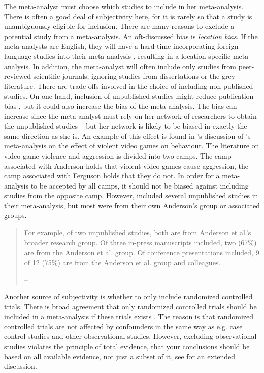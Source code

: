 The meta-analyst must choose which studies to include in her meta-analysis. There is often a good deal of subjectivity here, for it is rarely so that a study is unambiguously eligible for inclusion. There are many reasons to exclude a potential study from a meta-analysis. An oft-discussed bias is \emph{location bias}. If the meta-analysts are English, they will have a hard time incorporating foreign language studies into their meta-analysis \parencite{Egger1998-kj}, resulting in a location-specific meta-analysis. In addition, the meta-analyst will often include only studies from peer-reviewed scientific journals, ignoring studies from dissertations or the grey literature. There are trade-offs involved in the choice of including non-published studies. On one hand, inclusion of unpublished studies might reduce publication bias \parencite{Egger1997-ue}, but it could also increase the bias of the meta-analysis. The bias can increase since the meta-analyst must rely on her network of researchers to obtain the unpublished studies -- but her network is likely to be biased in exactly the same direction as she is. An example of this effect is found in \textcite{Ferguson2010-to}'s discussion of \textcite{Anderson2010-ki}'s meta-analysis on the effect of violent video games on behaviour. The literature on video game violence and aggression is divided into two camps. The camp associated with Anderson holds that violent video games cause aggression, the camp associated with Ferguson holds that they do not. In order for a meta-analysis to be accepted by all camps, it should not be biased against including studies from the opposite camp. However, \textcite{Anderson2010-ki} included several unpublished studies in their meta-analysis, but most were from their own Anderson's group or associated groups.
\begin{quote}
For example, of two unpublished studies, both are from Anderson et
al.'s broader research group. Of three in-press manuscripts
included, two (67\%) are from the Anderson et al. group. Of conference
presentations included, 9 of 12 (75\%) are from the Anderson et al.
group and colleagues. 
\begin{flushright}
-- \textcite[p. 2]{Ferguson2010-to}
\par\end{flushright}
\end{quote}
Another source of subjectivity is whether to only include randomized controlled trials. There is broad agreement that only randomized controlled trials should be included in a meta-analysis if these trials exists \parencite{Egger1997-ue}. The reason is that randomized controlled trials are not affected by confounders in the same way as e.g. case control studies and other observational studies. However, excluding observational studies violates the principle of total evidence, that your conclusions should be based on all available evidence, not just a subset of it, see \textcite{Stegenga2011-zo} for an extended discussion.

